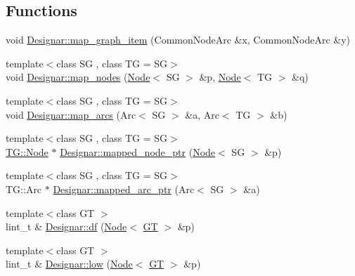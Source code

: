 \subsection*{Functions}
\begin{DoxyCompactItemize}
\item 
void \hyperlink{namespace_designar_a9f88b21c36d5175a156085da54ae0142}{Designar\+::map\+\_\+graph\+\_\+item} (Common\+Node\+Arc \&x, Common\+Node\+Arc \&y)
\item 
{\footnotesize template$<$class SG , class TG  = SG$>$ }\\void \hyperlink{namespace_designar_ac25cc2c91956f9d642d666212c11a7b4}{Designar\+::map\+\_\+nodes} (\hyperlink{test-mtreenode_8_c_a17a24b0725f59987143c5faf63c4dc6f}{Node}$<$ SG $>$ \&p, \hyperlink{test-mtreenode_8_c_a17a24b0725f59987143c5faf63c4dc6f}{Node}$<$ TG $>$ \&q)
\item 
{\footnotesize template$<$class SG , class TG  = SG$>$ }\\void \hyperlink{namespace_designar_a43f3e67569ab19b34f6e6a1073cab200}{Designar\+::map\+\_\+arcs} (Arc$<$ SG $>$ \&a, Arc$<$ TG $>$ \&b)
\item 
{\footnotesize template$<$class SG , class TG  = SG$>$ }\\\hyperlink{test-mtreenode_8_c_a17a24b0725f59987143c5faf63c4dc6f}{T\+G\+::\+Node} $\ast$ \hyperlink{namespace_designar_aff258240f7d203d3ea3beb526faed976}{Designar\+::mapped\+\_\+node\+\_\+ptr} (\hyperlink{test-mtreenode_8_c_a17a24b0725f59987143c5faf63c4dc6f}{Node}$<$ SG $>$ \&p)
\item 
{\footnotesize template$<$class SG , class TG  = SG$>$ }\\T\+G\+::\+Arc $\ast$ \hyperlink{namespace_designar_aebe025edea41b779d1c918b8d6e05ff5}{Designar\+::mapped\+\_\+arc\+\_\+ptr} (Arc$<$ SG $>$ \&a)
\item 
{\footnotesize template$<$class GT $>$ }\\lint\+\_\+t \& \hyperlink{namespace_designar_aacbba165f7a2d6b320e94303dc54aa2b}{Designar\+::df} (\hyperlink{test-mtreenode_8_c_a17a24b0725f59987143c5faf63c4dc6f}{Node}$<$ \hyperlink{demo-buildgraph_8_c_a3001c40d2c31ca87ed96cd7d1334a55e}{GT} $>$ \&p)
\item 
{\footnotesize template$<$class GT $>$ }\\lint\+\_\+t \& \hyperlink{namespace_designar_accdbfaff311d99b93c324947ce57dbda}{Designar\+::low} (\hyperlink{test-mtreenode_8_c_a17a24b0725f59987143c5faf63c4dc6f}{Node}$<$ \hyperlink{demo-buildgraph_8_c_a3001c40d2c31ca87ed96cd7d1334a55e}{GT} $>$ \&p)

\end{DoxyCompactItemize}
